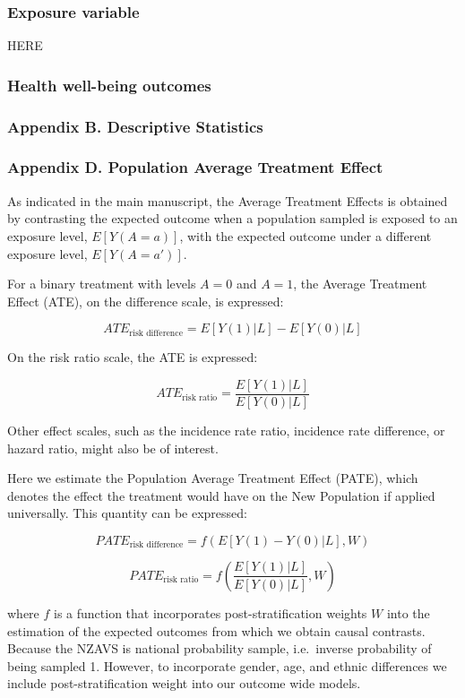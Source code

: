 \documentclass[
  singlecolumn]{article}
\begin{document}
\subsubsection{Exposure variable}\label{exposure-variable}

HERE

\subsubsection{Health well-being
outcomes}\label{health-well-being-outcomes}

\subsubsection{Appendix B. Descriptive
Statistics}\label{appendix-b.-descriptive-statistics}

\subsubsection{Appendix D. Population Average Treatment
Effect}\label{appendix-d.-population-average-treatment-effect}

As indicated in the main manuscript, the Average Treatment Effects is
obtained by contrasting the expected outcome when a population sampled
is exposed to an exposure level, \(E[Y(A = a)]\), with the expected
outcome under a different exposure level, \(E[Y(A=a')]\).

For a binary treatment with levels \(A=0\) and \(A=1\), the Average
Treatment Effect (ATE), on the difference scale, is expressed:

\[ATE_{\text{risk difference}} = E[Y(1)|L] - E[Y(0)|L]\]

On the risk ratio scale, the ATE is expressed:

\[ATE_{\text{risk ratio}} = \frac{E[Y(1)|L]}{E[Y(0)|L]}\]

Other effect scales, such as the incidence rate ratio, incidence rate
difference, or hazard ratio, might also be of interest.

Here we estimate the Population Average Treatment Effect (PATE), which
denotes the effect the treatment would have on the New Population if
applied universally. This quantity can be expressed:

\[PATE_{\text{risk difference}} = f(E[Y(1) - Y(0)|L], W)\]

\[PATE_{\text{risk ratio}} = f\left(\frac{E[Y(1)|L]}{E[Y(0)|L]}, W\right)\]

where \(f\) is a function that incorporates post-stratification weights
\(W\) into the estimation of the expected outcomes from which we obtain
causal contrasts. Because the NZAVS is national probability sample,
i.e.~inverse probability of being sampled 1. However, to incorporate
gender, age, and ethnic differences we include post-stratification
weight into our outcome wide models.
\end{document}
